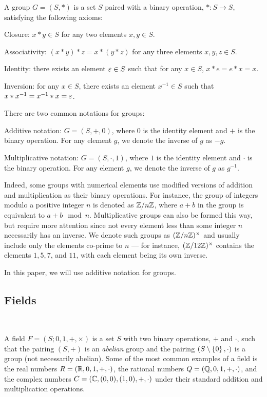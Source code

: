 A group $G = (S, \ast)$ is a set $S$ paired with a binary operation,
$\ast : S \to S$, satisfying the following axioms:
\begin{enumroman}
  \item Closure: $x \ast y \in S$ for any two elements $x, y \in S$.
  \item Associativity: $(x \ast y) \ast z = x \ast (y \ast z)$
    for any three elements $x, y, z \in S$.
  \item Identity: there exists an element $\varepsilon \in S$ such that
    for any $x \in S$, $x \ast e = e \ast x = x$.
  \item Inversion: for any $x \in S$, there exists an element
    $x^{-1} \in S$ such that $x \ast x^{-1} = x^{-1} \ast x = \varepsilon$.
\end{enumroman}
There are two common notations for groups:
\begin{enumroman}
  \item Additive notation: $G = (S, +, 0)$, where $0$ is the identity
    element and $+$ is the binary operation.
    For any element $g$, we denote the inverse of $g$ as $-g$.
  \item Multiplicative notation: $G = (S, \cdot, 1)$, where $1$ is the
    identity element and $\cdot$ is the binary operation.
    For any element $g$, we denote the inverse of $g$ as $g^{-1}$.
\end{enumroman}

Indeed, some groups with numerical elements use modified versions of
addition and multiplication as their binary operations.
For instance, the group of integers modulo a positive integer $n$
is denoted as $\mathbb{Z}/n\mathbb{Z}$, where $a + b$ in the group is equivalent
to $a + b \mod n$.
Multiplicative groups can also be formed this way, but require
more attention since not every element less than some integer $n$
necessarily has an inverse. We denote such groups as $(\mathbb{Z}/n\mathbb{Z})^\times$
and usually include only the elements co-prime to $n$ ---
for instance, $(\mathbb{Z}/12\mathbb{Z})^\times$ contains the elements $1, 5, 7$, and $11$,
with each element being its own inverse.

In this paper, we will use additive notation for groups.

\subsection{Fields}~\label{sec:def-fields}

A field $F = (S; 0, 1, +, \times)$ is a set $S$ with two binary operations, $+$ and $\cdot$,
such that the pairing $(S, +)$ is an \emph{abelian} group
and the pairing $(S \setminus \left\{ 0 \right\}, \cdot)$ is a 
group (not necessarily abelian). Some of the most common examples of a field
is the real numbers $R = (\mathbb{R}, 0, 1, +, \cdot)$, the rational numbers $Q = (\mathbb{Q}, 0, 1, +, \cdot)$,
and the complex numbers $C = (\mathbb{C}, (0, 0), (1, 0), +, \cdot)$ under their standard addition and multiplication
operations.


